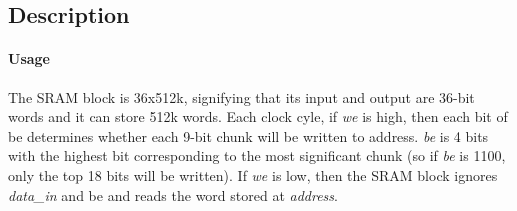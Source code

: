 \documentclass{article}
\newcommand{\BlockDesc}[1]{\subsection*{Description}#1}
\begin{document}
\BlockDesc{
\paragraph{Usage}
The SRAM block is 36x512k, signifying that its input and output are 36-bit words and it can store 512k words. Each clock cyle, if \textit{we} is high, then each bit of be determines whether each 9-bit chunk will be written to address. \textit{be} is 4 bits with the highest bit corresponding to the most significant chunk (so if \textit{be} is 1100, only the top 18 bits will be written). If \textit{we} is low, then the SRAM block ignores \textit{data\_in} and be and reads the word stored at \textit{address}.
}
 
\end{document}
